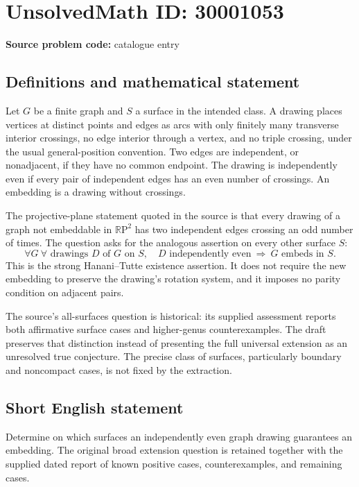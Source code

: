 \documentclass[11pt]{article}
\newcommand{\R}{\mathbb{R}}
\begin{document}
\section*{UnsolvedMath ID: 30001053}
\textbf{Source problem code:} catalogue entry
\subsection{Definitions and mathematical statement}
Let \(G\) be a finite graph and \(S\) a surface in the intended class. A drawing places vertices at distinct points and edges as arcs with only finitely many transverse interior crossings, no edge interior through a vertex, and no triple crossing, under the usual general-position convention. Two edges are independent, or nonadjacent, if they have no common endpoint. The drawing is independently even if every pair of independent edges has an even number of crossings. An embedding is a drawing without crossings.

The projective-plane statement quoted in the source is that every drawing of a graph not embeddable in \(\R\mathrm P^2\) has two independent edges crossing an odd number of times. The question asks for the analogous assertion on every other surface \(S\):
\[
\forall G\ \forall\text{ drawings }D\text{ of }G\text{ on }S,
\quad D\text{ independently even}\ \Longrightarrow\ G\text{ embeds in }S.
\]
This is the strong Hanani--Tutte existence assertion. It does not require the new embedding to preserve the drawing's rotation system, and it imposes no parity condition on adjacent pairs.

The source's all-surfaces question is historical: its supplied assessment reports both affirmative surface cases and higher-genus counterexamples. The draft preserves that distinction instead of presenting the full universal extension as an unresolved true conjecture. The precise class of surfaces, particularly boundary and noncompact cases, is not fixed by the extraction.
\subsection{Short English statement}
Determine on which surfaces an independently even graph drawing guarantees an embedding. The original broad extension question is retained together with the supplied dated report of known positive cases, counterexamples, and remaining cases.
\end{document}
